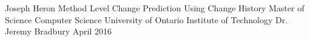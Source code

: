 

\usepackage{tabularx}
\usepackage{hyperref}
\usepackage{url}

\hypersetup{
    colorlinks,
    citecolor=black,
    filecolor=black,
    linkcolor=black,
    urlcolor=black
}



\thesisTitle
  {Joseph Heron}
  {Method Level Change Prediction Using Change History}
  {Master of Science}
  {Computer Science}
  {University of Ontario Institute of Technology}
  {Dr. Jeremy Bradbury}
  {April}
  {2016}




\singlespacing
\tableofcontents
\listoffigures
\listoftables
\lstlistoflistings
\printglossary[style=list]
\clearpage
\doublespacing



%



%






